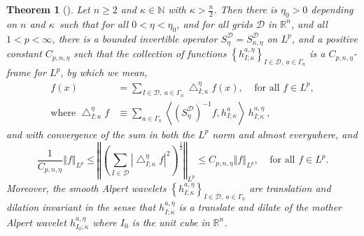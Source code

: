 \documentclass{amsart}%
\newtheorem{theorem}{Theorem}
\theoremstyle{plain}
\numberwithin{equation}{section}
\begin{document}
\begin{theorem}
[\cite{Saw7}]\label{reproducing}Let $n\geq2$ and $\kappa\in\mathbb{N}$ with
$\kappa>\frac{n}{2}$. Then there is $\eta_{0}>0$ depending on $n$ and $\kappa
$\ such that for all $0<\eta<\eta_{0}$, and for all grids $\mathcal{D}$ in
$\mathbb{R}^{n} $, and all $1<p<\infty$, there is a bounded invertible
operator $S_{\eta}^{\mathcal{D}}=S_{\kappa,\eta}^{\mathcal{D}}$ on $L^{p}$,
and a positive constant $C_{p,n,\eta}$ such that the collection of functions
$\left\{  h_{I;\kappa}^{a,\eta}\right\}  _{I\in\mathcal{D},\ a\in\Gamma_{n}}$
is a $C_{p,n,\eta}$-frame for $L^{p}$, by which we mean,%
\begin{align}
f\left(  x\right)   &  =\sum_{I\in\mathcal{D},\ a\in\Gamma_{n}}\bigtriangleup
_{I;\kappa}^{\eta}f\left(  x\right)  ,\ \ \ \ \ \text{for all }f\in
L^{p},\label{bounded below}\\
\text{where }\bigtriangleup_{I;\kappa}^{\eta}f  &  \equiv\sum_{a\in\Gamma_{n}%
}\left\langle \left(  S_{\eta}^{\mathcal{D}}\right)  ^{-1}f,h_{I;\kappa}%
^{a}\right\rangle \ h_{I;\kappa}^{a,\eta}\ ,\nonumber
\end{align}
and with convergence of the sum in both the $L^{p}$ norm and almost
everywhere, and%
\begin{equation}
\frac{1}{C_{p,n,\eta}}\left\Vert f\right\Vert _{L^{p}}\leq\left\Vert \left(
\sum_{I\in\mathcal{D}}\left\vert \bigtriangleup_{I;\kappa}^{\eta}f\right\vert
^{2}\right)  ^{\frac{1}{2}}\right\Vert _{L^{p}}\leq C_{p,n,\eta}\left\Vert
f\right\Vert _{L^{p}},\ \ \ \ \ \text{for all }f\in L^{p}.\label{square est}%
\end{equation}
Moreover, the smooth Alpert wavelets $\left\{  h_{I;\kappa}^{a,\eta}\right\}
_{I\in\mathcal{D},\ a\in\Gamma_{n}}$ are translation and dilation invariant in
the sense that $h_{I;\kappa}^{a,\eta}$ is a translate and dilate of the mother
Alpert wavelet $h_{I_{0};\kappa}^{a,\eta}$ where $I_{0}$ is the unit cube in
$\mathbb{R}^{n}$.
\end{theorem}
\end{document}
